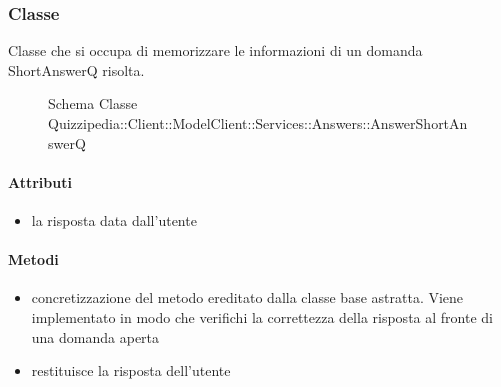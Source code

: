\subsubsection{Classe }
Classe che si occupa di memorizzare le informazioni di un domanda ShortAnswerQ risolta.
\begin{figure}[H]
\centering
\noindent{}
\caption[Schema Classe AnswerShortAnswerQ]{Schema Classe Quizzipedia::Client::ModelClient::Services::Answers::AnswerShortAnswerQ}
\end{figure}
\paragraph{Attributi}
\begin{itemize}
\item {}
\newline
la risposta data dall'utente
\end{itemize}
\paragraph{Metodi}
\begin{itemize}
\item {}
\newline
concretizzazione del metodo ereditato dalla classe base astratta. Viene implementato in modo che verifichi la correttezza della risposta al fronte di una domanda aperta
\newline
\item {}
\newline
restituisce la risposta dell'utente
\newline
\end{itemize}
